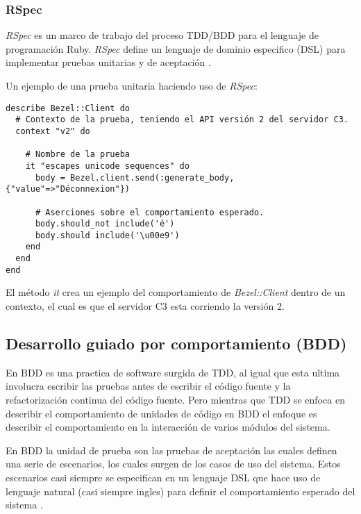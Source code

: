 \subsubsection{RSpec}
\textit{RSpec} es un marco de trabajo del proceso TDD/BDD para el lenguaje de
programación Ruby. \textit{RSpec} define un lenguaje de dominio especifico (DSL)
para implementar pruebas unitarias y de aceptación \cite{23_chelimsky_2010}.

\vspace{2.5mm}

Un ejemplo de una prueba unitaria haciendo uso de \textit{RSpec}:
\begin{verbatim}
describe Bezel::Client do
  # Contexto de la prueba, teniendo el API versión 2 del servidor C3.
  context "v2" do

    # Nombre de la prueba
    it "escapes unicode sequences" do
      body = Bezel.client.send(:generate_body,{"value"=>"Déconnexion"})

      # Aserciones sobre el comportamiento esperado.
      body.should_not include('é')
      body.should include('\u00e9')
    end
  end
end
\end{verbatim}

El método \textit{it} crea un ejemplo del comportamiento de \textit{Bezel::Client}
dentro de un contexto, el cual es que el servidor C3 esta corriendo la versión 2.

\subsection{Desarrollo guiado por comportamiento (BDD)}
En BDD es una practica de software surgida de TDD, al igual que esta ultima
involucra escribir las pruebas antes de escribir el código fuente y la
refactorización continua del código fuente. Pero mientras que TDD se enfoca
en describir el comportamiento de unidades de código en BDD el enfoque es
describir el comportamiento en la interacción de varios módulos del sistema.

En BDD la unidad de prueba son las pruebas de aceptación las cuales definen
una serie de escenarios, los cuales surgen de los casos de uso del sistema.
Estos escenarios casi siempre se especifican en un lenguaje DSL que hace uso
de lenguaje natural (casi siempre ingles) para definir el comportamiento
esperado del sistema \cite{23_chelimsky_2010}.


